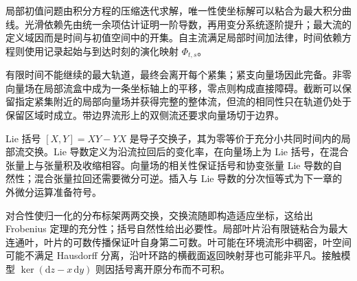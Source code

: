 \begin{chaptersummary}
	局部初值问题由积分方程的压缩迭代求解，唯一性使坐标解可以粘合为最大积分曲线。光滑依赖先由统一余项估计证明一阶导数，再用变分系统逐阶提升；最大流的定义域因而是时间与初值空间中的开集。自主流满足局部时间加法律，时间依赖方程则使用记录起始与到达时刻的演化映射 \(\Phi_{t,s}\)。

	\ProseParagraphBreak

	有限时间不能继续的最大轨道，最终会离开每个紧集；紧支向量场因此完备。非零向量场在局部流盒中成为一条坐标轴上的平移，零点则构成直接障碍。截断可以保留指定紧集附近的局部向量场并获得完整的整体流，但流的相同性只在轨道仍处于保留区域时成立。带边界流形上的双侧流还要求向量场切于边界。

	\ProseParagraphBreak

	Lie 括号 \([X,Y]=XY-YX\) 是导子交换子，其为零等价于充分小共同时间内的局部流交换。Lie 导数定义为沿流拉回后的变化率，在向量场上为 Lie 括号，在混合张量上与张量积及收缩相容。向量场的相关性保证括号和协变张量 Lie 导数的自然性；混合张量拉回还需要微分可逆。插入与 Lie 导数的分次恒等式为下一章的外微分运算准备符号。

	\ProseParagraphBreak

	对合性使归一化的分布标架两两交换，交换流随即构造适应坐标，这给出 Frobenius 定理的充分性；括号自然性给出必要性。局部叶片沿有限链粘合为最大连通叶，叶片的可数传播保证叶自身第二可数。叶可能在环境流形中稠密，叶空间可能不满足 Hausdorff 分离，沿叶环路的横截面返回映射芽也可能非平凡。接触模型 \(\ker(\mathrm{d}z-x\,\mathrm{d}y)\) 则因括号离开原分布而不可积。
\end{chaptersummary}

\BookExercises

